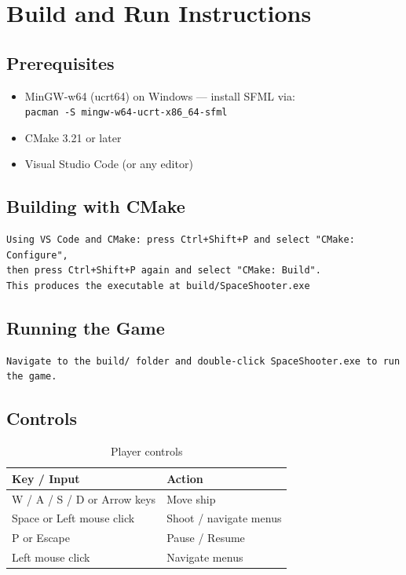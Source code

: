 \documentclass[11pt]{article}
\begin{document}
\clearpage
\appendix
\section{Build and Run Instructions}
\label{sec:install}

\subsection{Prerequisites}
\begin{itemize}
    \item MinGW-w64 (ucrt64) on Windows --- install SFML via:\\
          \texttt{pacman -S mingw-w64-ucrt-x86\_64-sfml}
    \item CMake 3.21 or later
    \item Visual Studio Code (or any editor)
\end{itemize}

\subsection{Building with CMake}
\begin{lstlisting}[language={}]
Using VS Code and CMake: press Ctrl+Shift+P and select "CMake: Configure",
then press Ctrl+Shift+P again and select "CMake: Build".
This produces the executable at build/SpaceShooter.exe
\end{lstlisting}

\subsection{Running the Game}
\begin{lstlisting}[language={}]
Navigate to the build/ folder and double-click SpaceShooter.exe to run the game.
\end{lstlisting}

\subsection{Controls}

\begin{table}[H]
    \centering
    \begin{tabular}{ll}
        \toprule
        \textbf{Key / Input}        & \textbf{Action} \\
        \midrule
        W / A / S / D or Arrow keys & Move ship \\
        Space or Left mouse click   & Shoot / navigate menus \\
        P or Escape                 & Pause / Resume \\
        Left mouse click            & Navigate menus \\
        \bottomrule
    \end{tabular}
    \caption{Player controls}
\end{table}
\end{document}
